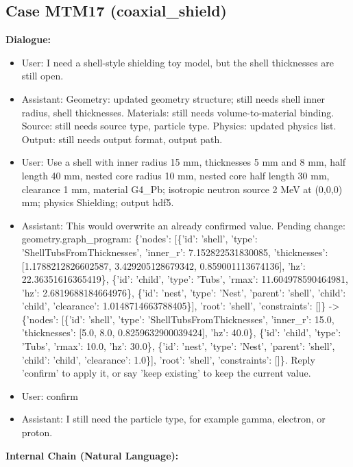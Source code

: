 \documentclass[11pt]{ctexart}
\begin{document}
\subsection{Case MTM17 (coaxial\_shield)}
\textbf{Dialogue:}
\begin{itemize}
\item User: I need a shell-style shielding toy model, but the shell thicknesses are still open.
\item Assistant: Geometry: updated geometry structure; still needs shell inner radius, shell thicknesses. Materials: still needs volume-to-material binding. Source: still needs source type, particle type. Physics: updated physics list. Output: still needs output format, output path.
\item User: Use a shell with inner radius 15 mm, thicknesses 5 mm and 8 mm, half length 40 mm, nested core radius 10 mm, nested core half length 30 mm, clearance 1 mm, material G4\_Pb; isotropic neutron source 2 MeV at (0,0,0) mm; physics Shielding; output hdf5.
\item Assistant: This would overwrite an already confirmed value. Pending change: geometry.graph\_program: \{'nodes': [\{'id': 'shell', 'type': 'ShellTubsFromThicknesses', 'inner\_r': 7.152822531830085, 'thicknesses': [1.1788212826602587, 3.429205128679342, 0.859001113674136], 'hz': 22.36351616365419\}, \{'id': 'child', 'type': 'Tubs', 'rmax': 11.604978590464981, 'hz': 2.6819688184664976\}, \{'id': 'nest', 'type': 'Nest', 'parent': 'shell', 'child': 'child', 'clearance': 1.0148714663788405\}], 'root': 'shell', 'constraints': []\} -> \{'nodes': [\{'id': 'shell', 'type': 'ShellTubsFromThicknesses', 'inner\_r': 15.0, 'thicknesses': [5.0, 8.0, 0.8259632900039424], 'hz': 40.0\}, \{'id': 'child', 'type': 'Tubs', 'rmax': 10.0, 'hz': 30.0\}, \{'id': 'nest', 'type': 'Nest', 'parent': 'shell', 'child': 'child', 'clearance': 1.0\}], 'root': 'shell', 'constraints': []\}. Reply 'confirm' to apply it, or say 'keep existing' to keep the current value.
\item User: confirm
\item Assistant: I still need the particle type, for example gamma, electron, or proton.
\end{itemize}
\textbf{Internal Chain (Natural Language):}
\end{document}
